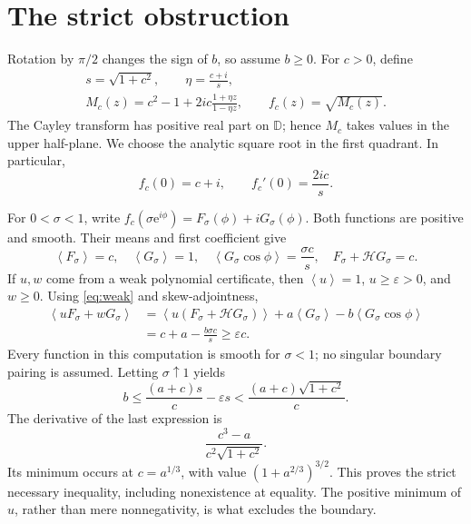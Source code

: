 \documentclass[11pt]{article}
\theoremstyle{remark}\newtheorem{remark}[theorem]{Remark}
\newcommand{\D}{\mathbb D}
\newcommand{\avg}[1]{\left\langle #1\right\rangle}
\newcommand{\ee}{\mathrm e}
\begin{document}
\section{The strict obstruction}
Rotation by \(\pi/2\) changes the sign of \(b\), so assume \(b\ge0\).
For \(c>0\), define
\begin{equation}\label{eq:test}
 \begin{gathered}
 s=\sqrt{1+c^2},\qquad \eta=\frac{c+i}{s},\\
 M_c(z)=c^2-1+2ic\frac{1+\eta z}{1-\eta z},
 \qquad f_c(z)=\sqrt{M_c(z)}.
 \end{gathered}
\end{equation}
The Cayley transform has positive real part on \(\D\); hence
\(M_c\) takes values in the upper half-plane. We choose the
analytic square root in the first quadrant. In particular,
\begin{equation}\label{eq:fcoeff}
 f_c(0)=c+i,\qquad f_c'(0)=\frac{2ic}{s}.
\end{equation}

For \(0<\sigma<1\), write
\(f_c(\sigma\ee^{i\phi})=F_\sigma(\phi)+iG_\sigma(\phi)\).
Both functions are positive and smooth. Their means and first
coefficient give
\begin{equation}\label{eq:testmeans}
 \avg{F_\sigma}=c,\quad \avg{G_\sigma}=1,\quad
 \avg{G_\sigma\cos\phi}=\frac{\sigma c}{s},\quad
 F_\sigma+\mathcal HG_\sigma=c.
\end{equation}
If \(u,w\) come from a weak polynomial certificate, then
\(\avg u=1\), \(u\ge\varepsilon>0\), and \(w\ge0\).
Using \eqref{eq:weak} and skew-adjointness,
\begin{align}
 \avg{uF_\sigma+wG_\sigma}
 &=\avg{u(F_\sigma+\mathcal HG_\sigma)}
      +a\avg{G_\sigma}-b\avg{G_\sigma\cos\phi}\nonumber\\
 &=c+a-\frac{b\sigma c}{s}\ge\varepsilon c.
 \label{eq:pairing}
\end{align}
Every function in this computation is smooth for \(\sigma<1\);
no singular boundary pairing is assumed.
Letting \(\sigma\uparrow1\) yields
\begin{equation}\label{eq:dual}
 b\le\frac{(a+c)s}{c}-\varepsilon s
      <\frac{(a+c)\sqrt{1+c^2}}c.
\end{equation}
The derivative of the last expression is
\[
 \frac{c^3-a}{c^2\sqrt{1+c^2}}.
\]
Its minimum occurs at \(c=a^{1/3}\), with value
\((1+a^{2/3})^{3/2}\). This proves the strict necessary
inequality, including nonexistence at equality. The positive
minimum of \(u\), rather than mere nonnegativity, is what
excludes the boundary.
\end{document}
